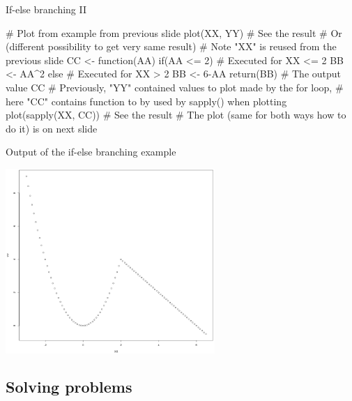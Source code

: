 \documentclass[compress, ucs, xelatex, 11pt, xcolor=svgnames,
	hyperref={
		bookmarks=true,
		unicode=true,
		colorlinks=true,
		pdftitle={Molecular data in R},
		plainpages=false,
		pdfauthor={Vojtech Zeisek},
		pdfsubject={Course about phylogeny and evolution in R},
		pdfcreator={XeLaTeX},
		pdfkeywords={R, evolution, phylogeny, molecular data},
		linkcolor=Tomato,
		anchorcolor=SaddleBrown,
		citecolor=Goldenrod,
		filecolor=DarkMagenta,
		menucolor=Sienna,
		urlcolor=DarkTurquoise,
		pdftex},
	url={hyphens, lowtilde} %
	]{beamer}
\begin{document}
\begin{frame}[fragile]{If-else branching II}
	\begin{spluscode}
    # Plot from example from previous slide
    plot(XX, YY) # See the result
    # Or (different possibility to get very same result)
    # Note "XX" is reused from the previous slide
    CC <- function(AA) {
      if(AA <= 2) { # Executed for XX <= 2
      BB <- AA^2
      } else { # Executed for XX > 2
        BB <- 6-AA
        }
      return(BB) # The output value
      }
     CC # Previously, "YY" contained values to plot made by the for loop,
        # here "CC" contains function to by used by sapply() when plotting
     plot(sapply(XX, CC)) # See the result
    # The plot (same for both ways how to do it) is on next slide
	\end{spluscode}
\end{frame}

\begin{frame}{Output of the if-else branching example}
	\begin{center}
		\includegraphics[height=7cm]{if-else.png}
	\end{center}
\end{frame}

\subsection{Solving problems}
\end{document}
